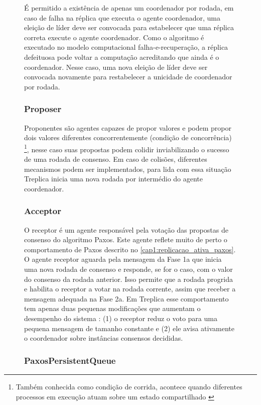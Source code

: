 \begin{figure}[ht]
É permitido a existência de apenas um coordenador por rodada, em caso de falha na réplica
que executa o agente coordenador, uma eleição de líder deve ser convocada para estabelecer
que uma réplica correta execute o agente coordenador. Como o algoritmo é executado no
modelo computacional falha-e-recuperação, a réplica defeituosa pode voltar a computação
acreditando que ainda é o coordenador. Nesse caso, uma nova eleição de líder deve ser
convocada novamente para restabelecer a unicidade de coordenador por rodada.

\subsubsection{Proposer}

Proponentes são agentes capazes de propor valores e podem propor dois valores diferentes
concorrentemente (condição de concorrência) \footnote{Também conhecida como condição de
corrida, acontece quando diferentes processos em execução atuam sobre um estado
compartilhado \cite{goetz06}}, nesse caso suas propostas podem colidir inviabilizando o
sucesso de uma rodada de consenso. Em caso de colisões, diferentes mecanismos podem ser
implementados, para lida com essa situação Treplica inicia uma nova rodada por intermédio
do agente coordenador.

\subsubsection{Acceptor}

O receptor é um agente responsável pela votação das propostas de consenso do algoritmo
Paxos. Este agente reflete muito de perto o comportamento de Paxos descrito no
\autoref{cap1:replicacao_ativa_paxos}. O agente receptor aguarda pela mensagem da Fase 1a
que inicia uma nova rodada de consenso e responde, se for o caso, com o valor do consenso
da rodada anterior. Isso permite que a rodada progrida e habilita o receptor a votar na
rodada corrente, assim que receber a mensagem adequada na Fase 2a. Em Treplica esse
comportamento tem apenas duas pequenas modificações que aumentam o desempenho do sistema
\cite{vieira-tr10b}: (1) o receptor reduz o voto para uma pequena mensagem de tamanho
constante e (2) ele avisa ativamente o coordenador sobre instâncias consensos decididas.

\subsubsection{PaxosPersistentQueue}


\end{figure}
